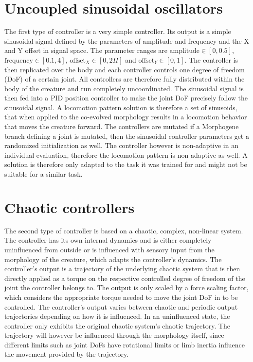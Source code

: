 \documentclass[main]{subfiles}
\begin{document}
\section{Uncoupled sinusoidal oscillators}
\label{sec:sinusoidal-oscillators}

The first type of controller is a very simple controller. Its output is a simple sinusoidal signal defined by the parameters of amplitude and frequency and the X and Y offset in signal space. The parameter ranges are $\text{amplitude} \in [0,0.5]$, $\text{frequency} \in [0.1,4]$, $\text{offset}_X \in [0,2\Pi]$ and $\text{offset}_Y \in [0,1]$. The controller is then replicated over the body and each controller controls one degree of freedom (DoF) of a certain joint. All controllers are therefore fully distributed within the body of the creature and run completely uncoordinated. The sinusoidal signal is then fed into a PID position controller to make the joint DoF precisely follow the sinusoidal signal. A locomotion pattern solution is therefore a set of sinusoids, that when applied to the co-evolved morphology results in a locomotion behavior that moves the creature forward. The controllers are mutated if a Morphogene branch defining a joint is mutated, then the sinusoidal controller parameters get a randomized initialization as well. The controller however is non-adaptive in an individual evaluation, therefore the locomotion pattern is non-adaptive as well. A solution is therefore only adapted to the task it was trained for and might not be suitable for a similar task.

\section{Chaotic controllers}

The second type of controller is based on a chaotic, complex, non-linear system. The controller has its own internal dynamics and is either completely uninfluenced from outside or is influenced with sensory input from the morphology of the creature, which adapts the controller's dynamics. The controller's output is a trajectory of the underlying chaotic system that is then directly applied as a torque on the respective controlled degree of freedom of the joint the controller belongs to. The output is only scaled by a force scaling factor, which considers the appropriate torque needed to move the joint DoF in to be controlled. The controller's output varies between chaotic and periodic output trajectories depending on how it is influenced. In an uninfluenced state, the controller only exhibits the original chaotic system's chaotic trajectory. The trajectory will however be influenced through the morphology itself, since different limits such as joint DoFs have rotational limits or limb inertia influence the movement provided by the trajectory.
\end{document}
